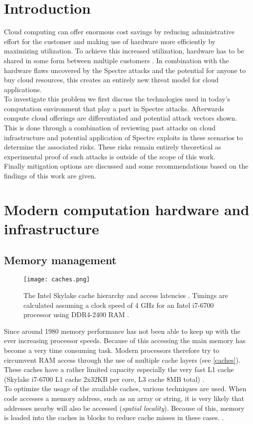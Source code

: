 \documentclass[conference,compsoc,final,a4paper]{IEEEtran}
\begin{document}
\section{Introduction}
Cloud computing can offer enormous cost savings by reducing administrative effort for the customer and making use of hardware more efficiently by maximizing utilization. To achieve this increased utilization, hardware has to be shared in some form between multiple customers \cite{mell2011nist}. In combination with the hardware flaws uncovered by the Spectre attacks and the potential for anyone to buy cloud resources, this creates an entirely new threat model for cloud applications. \\
To investigate this problem we first discuss the technologies used in today's computation environment that play a part in Spectre attacks. Afterwards compute cloud offerings are differentiated and potential attack vectors shown. This is done through a combination of reviewing past attacks on cloud infrastructure and potential application of Spectre exploits in these scenarios to determine the associated risks. These risks remain entirely theoretical as experimental proof of such attacks is outside of the scope of this work. \\
Finally mitigation options are discussed and some recommendations based on the findings of this work are given.

\section{Modern computation hardware and infrastructure}
\subsection{Memory management}
\begin{figure}[!ht]
\centering
\texttt{[image: caches.png]}
\caption{The Intel Skylake cache hierarchy and access latencies \cite{fog2012microarchitecture}. Timings are calculated assuming a clock speed of 4 GHz for an Intel i7-6700 processor using DDR4-2400 RAM \cite{skylakeBenchmark}. }
\label{caches}
\end{figure}
Since around 1980 memory performance has not been able to keep up with the ever increasing processor speeds. \cite[p.~73]{hennessy2011computer} Because of this accessing the main memory has become a very time consuming task. Modern processors therefore try to circumvent RAM access through the use of multiple cache layers (see \autoref{caches}). These caches have a rather limited capacity especially the very fast L1 cache (Skylake i7-6700 L1 cache 2x32KB per core, L3 cache 8MB total) \cite{skylakeBenchmark}. \\
To optimize the usage of the available caches, various techniques are used. When code accesses a memory address, such as an array or string, it is very likely that addresses nearby will also be accessed (\emph{spatial locality}). Because of this, memory is loaded into the caches in blocks to reduce cache misses in these cases. \cite[p.~74]{hennessy2011computer}. \\
\end{document}
